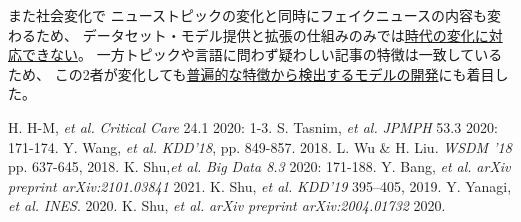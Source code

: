 また社会変化で
ニューストピックの変化と同時にフェイクニュースの内容も変わるため、
データセット・モデル提供と拡張の仕組みのみでは\underline{時代の変化に対応できない}。
一方トピックや言語に問わず疑わしい記事の特徴は一致しているため、
この2者が変化しても\underline{普遍的な特徴から検出するモデルの開発}にも着目した。


{\footnotesize 
\begin{twobibliography}{99}
    \setlength{\parskip}{0cm}
    \setlength{\itemsep}{0cm}
     H. H-M, \textit{et al.} \textit{Critical Care} 24.1 2020: 1-3.
     S. Tasnim, \textit{et al.} \textit{JPMPH} 53.3 2020: 171-174.
     Y. Wang, \textit{et al.} \textit{KDD'18}, pp. 849-857. 2018.
     L. Wu \& H. Liu. \textit{WSDM '18}  pp. 637-645, 2018.
     K. Shu,\textit{et al.} \textit{Big Data 8.3} 2020: 171-188.
     Y. Bang, \textit{et al.} \textit{arXiv preprint arXiv:2101.03841} 2021.
     K. Shu, \textit{et al.} \textit{KDD'19} 395–405, 2019.
     Y. Yanagi, \textit{et al.} \textit{INES}. 2020.
     K. Shu, \textit{et al.}  \textit{arXiv preprint arXiv:2004.01732} 2020.
\end{twobibliography}
}


